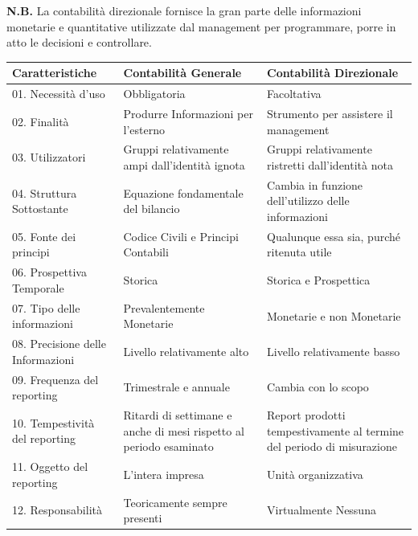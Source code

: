 \documentclass{article}
\renewcommand{\arraystretch}{1.5}
\begin{document}
\textbf{N.B.} La contabilità direzionale fornisce la gran parte delle informazioni monetarie e quantitative utilizzate dal management per programmare, porre in atto le decisioni e controllare.
\begin{center}
\renewcommand{\arraystretch}{2.5}
\begin{tabular}{|l|m{5cm}|m{5cm}|}
    \hline
    \textbf{\color{synthwave_text}Caratteristiche} & \textbf{\color{synthwave_text}Contabilità Generale} & \textbf{\color{synthwave_text}Contabilità Direzionale}\\
    \hline 
    01. Necessità d'uso &Obbligatoria &Facoltativa\\
    \hline 
    02. Finalità&Produrre Informazioni per l'esterno&Strumento per assistere il management\\
    \hline 
    03. Utilizzatori&Gruppi relativamente ampi dall'identità ignota&Gruppi relativamente ristretti dall'identità nota\\
    \hline 
    04. Struttura Sottostante&Equazione fondamentale del bilancio&Cambia in funzione dell'utilizzo delle informazioni\\
    \hline 
    05. Fonte dei principi&Codice Civili e Principi Contabili&Qualunque essa sia, purché ritenuta utile\\
    \hline 
    06. Prospettiva Temporale&Storica&Storica e Prospettica\\
    \hline 
    07. Tipo delle informazioni&Prevalentemente Monetarie&Monetarie e non Monetarie\\
    \hline 
    08. Precisione delle Informazioni&Livello relativamente alto&Livello relativamente basso\\
    \hline 
    09. Frequenza del reporting&Trimestrale e annuale&Cambia con lo scopo\\
    \hline 
    10. Tempestività del reporting&Ritardi di settimane e anche di mesi rispetto al periodo esaminato&Report prodotti tempestivamente al termine del periodo di misurazione\\
    \hline 
    11. Oggetto del reporting&L'intera impresa&Unità organizzativa\\
    \hline 
    12. Responsabilità&Teoricamente sempre presenti&Virtualmente Nessuna\\
    \hline 
\end{tabular}
\end{center}
\end{document}
